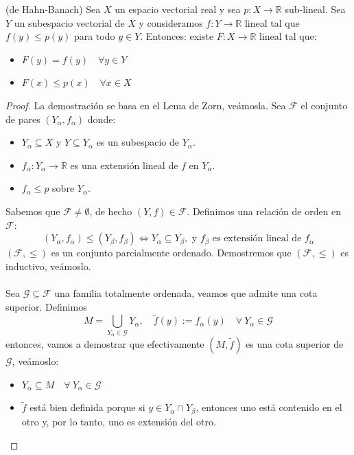 \begin{teo}(de Hahn-Banach)
    Sea $X$ un espacio vectorial real y sea $p: X \to \mathbb{R}$ sub-lineal. Sea $Y$ un subespacio vectorial de $X$ y consideramos $f: Y \to \mathbb{R}$ lineal tal que $f(y) \leq p(y)$ para todo $y \in Y$. Entonces: existe $F: X \to \mathbb{R}$ lineal tal que:

    \begin{itemize}
        \item[i)] $F(y) = f(y) \quad \forall y \in Y$
        \item[ii)] $F(x) \leq p(x) \quad \forall x \in X$
    \end{itemize}
\begin{proof}
    La demostración se basa en el Lema de Zorn, veámosla. Sea $\mathcal{F}$ el conjunto de pares $(Y_\alpha, f_\alpha)$ donde:
    \begin{itemize}
        \item[i)] $Y_\alpha \subseteq X$ y $Y \subseteq Y_\alpha$ es un subespacio de $Y_\alpha$.
        \item[ii)] $f_\alpha: Y_\alpha \to \mathbb{R}$ es una extensión lineal de $f$ en $Y_\alpha$.
        \item[iii)] $f_\alpha \leq p$ sobre $Y_\alpha$.
    \end{itemize}
    Sabemos que $\mathcal{F} \neq \emptyset$, de hecho $(Y, f) \in \mathcal{F}$. Definimos una relación de orden en $\mathcal{F}$:
    \begin{equation*}
        (Y_\alpha, f_\alpha) \leq (Y_\beta, f_\beta) \iff Y_\alpha \subseteq Y_\beta, \text{ y } f_\beta \text{ es extensión lineal de } f_\alpha
    \end{equation*}
    $(\mathcal{F}, \leq)$ es un conjunto parcialmente ordenado. Demostremos que $(\mathcal{F}, \leq)$ es inductivo, veámoslo. \\ \\
    \noindent
    Sea $\mathcal{G} \subseteq \mathcal{F}$ una familia totalmente ordenada, veamos que admite una cota superior. Definimos 
    $$M = \bigcup_{Y_\alpha \in \mathcal{G}} Y_\alpha, \quad \tilde{f}(y) := f_\alpha(y) \quad \forall \ Y_\alpha \in \mathcal{G}$$
    entonces, vamos a demostrar que efectivamente $(M, \tilde{f})$ es una cota superior de $\mathcal{G}$, veámoslo:
    \begin{itemize}
        \item[i)] $Y_\alpha \subseteq M \quad \forall \ Y_\alpha \in \mathcal{G}$
        \item[ii)] $\tilde{f}$ está bien definida porque si $y \in Y_\alpha \cap Y_\beta$, entonces uno está contenido en el otro y, por lo tanto, uno es extensión del otro.

\end{itemize}
\end{proof}
\end{teo}
